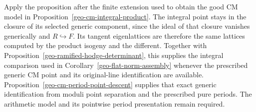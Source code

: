 Apply the proposition after the finite extension used to obtain the
good CM model in Proposition~\ref{geo-cm-integral-product}.
The integral point stays in the closure of its selected generic
component, since the ideal of that closure vanishes generically and
$R\hookrightarrow F$. Its tangent eigenlattices are therefore the
same lattices computed by the product isogeny and the different.
Together with Proposition~\ref{geo-ramified-hodge-determinant}, this
supplies the integral comparison used in
Corollary~\ref{geo-flat-norm-assembly} whenever the prescribed generic
CM point and its original-line identification are available.
Proposition~\ref{geo-cm-period-point-descent} supplies that exact generic
identification from moduli point separation and the prescribed pure
periods. The arithmetic model and its pointwise period presentation
remain required.

